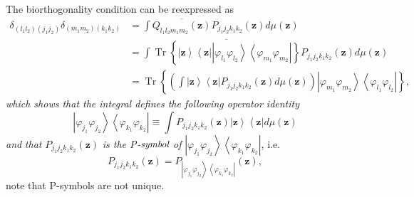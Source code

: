 \documentclass[aps,preprint]{revtex4}%
\begin{document}
The biorthogonality condition can be reexpressed as
\begin{align}
\delta_{\left(  l_{1}l_{2}\right)  \left(  j_{1}j_{2}\right)  }\delta_{\left(
m_{1}m_{2}\right)  \left(  k_{1}k_{2}\right)  }  &  =\int\overline
{Q_{l_{1}l_{2}m_{1}m_{2}}\left(  \mathbf{z}\right)  }P_{j_{1}j_{2}k_{1}k_{2}%
}\left(  \mathbf{z}\right)  d\mu\left(  \mathbf{z}\right) \nonumber\\
&  =\int\overline{\operatorname*{Tr}\left\{  \left\vert \mathbf{z}%
\right\rangle \left\langle \mathbf{z}\right\vert \left\vert \varphi_{l_{1}%
}\varphi_{l_{2}}\right\rangle \left\langle \varphi_{m_{1}}\varphi_{m_{2}%
}\right\vert \right\}  }P_{j_{1}j_{2}k_{1}k_{2}}\left(  \mathbf{z}\right)
d\mu\left(  \mathbf{z}\right) \nonumber\\
&  =\operatorname*{Tr}\left\{  \left(  \int\left\vert \mathbf{z}\right\rangle
\left\langle \mathbf{z}\right\vert P_{j_{1}j_{2}k_{1}k_{2}}\left(
\mathbf{z}\right)  d\mu\left(  \mathbf{z}\right)  \right)  \left\vert
\varphi_{m_{1}}\varphi_{m_{2}}\right\rangle \left\langle \varphi_{l_{1}%
}\varphi_{l_{2}}\right\vert \right\}  ,
\end{align}
\emph{which shows that the integral defines the following operator identity}
\begin{equation}
\left\vert \varphi_{j_{1}}\varphi_{j_{2}}\right\rangle \left\langle
\varphi_{k_{1}}\varphi_{k_{2}}\right\vert \equiv\int P_{j_{1}j_{2}k_{1}k_{2}%
}\left(  \mathbf{z}\right)  \left\vert \mathbf{z}\right\rangle \left\langle
\mathbf{z}\right\vert d\mu\left(  \mathbf{z}\right)
\end{equation}
\emph{and} \emph{that }$P_{j_{1}j_{2}k_{1}k_{2}}\left(  \mathbf{z}\right)  $
\emph{is the P}$\emph{-symbol}$ \emph{of} $\left\vert \varphi_{j_{1}}%
\varphi_{j_{2}}\right\rangle \left\langle \varphi_{k_{1}}\varphi_{k_{2}%
}\right\vert $, i.e.
\begin{equation}
P_{j_{1}j_{2}k_{1}k_{2}}\left(  \mathbf{z}\right)  =P_{\left\vert
\varphi_{j_{1}}\varphi_{j_{2}}\right\rangle \left\langle \varphi_{k_{1}%
}\varphi_{k_{2}}\right\vert }\left(  \mathbf{z}\right)  ,
\end{equation}
note that P-symbols are not unique.%
\end{document}
